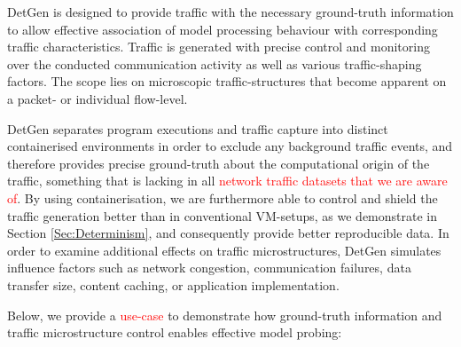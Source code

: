 \documentclass[runningheads]{llncs}
\begin{document}

DetGen is designed to provide traffic with the necessary ground-truth information to allow effective association of model processing behaviour with corresponding traffic characteristics. Traffic is generated with precise control and monitoring over the conducted communication activity as well as various traffic-shaping factors. The scope lies on microscopic traffic-structures that become apparent on a packet- or individual flow-level.

DetGen separates program executions and traffic capture into distinct containerised environments in order to exclude any background traffic events, and therefore provides precise ground-truth about the computational origin of the traffic, something that is lacking in all \textcolor{red}{network traffic datasets that we are aware of}. By using containerisation, we are furthermore able to control and shield the traffic generation better than in conventional VM-setups, as we demonstrate in Section \ref{Sec:Determinism}, and consequently provide better reproducible data. 
In order to examine additional effects on traffic microstructures, DetGen simulates influence factors such as network congestion, communication failures, data transfer size, content caching, or application implementation.

Below, we provide a \textcolor{red}{use-case} to demonstrate how ground-truth information and traffic microstructure control enables effective model probing:

\end{document}
